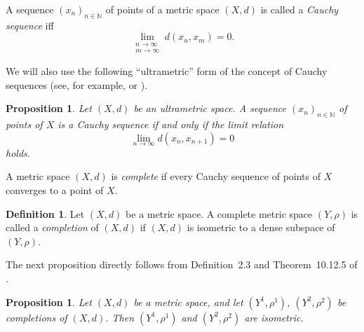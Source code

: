 \documentclass[11pt]{article}
\newtheorem{proposition}[theorem]{Proposition}
\theoremstyle{definition}
\newtheorem{definition}[theorem]{Definition}
\theoremstyle{remark}
\numberwithin{equation}{section}
\begin{document}
 A sequence $(x_n)_{n \in \mathbb{N}}$ of points of a metric space $(X,d)$ is called a {\it Cauchy sequence} iff
\begin{equation*}
    \lim\limits_{\substack{n \to \infty \\ m \to \infty}} d(x_n, x_m) = 0.
\end{equation*}



   



We will also use the following ``ultrametric'' form of the concept of Cauchy sequences (see, for example, \cite[p.~4]{PerezGarcia2010} or \cite[Theorem~1.6]{Comicheo2018}).

\begin{proposition}\label{prop:ultrametric-cauchy}
Let $(X,d)$ be an ultrametric space. A sequence $(x_n)_{n\in\mathbb{N}}$ of points of $X$ 
is a Cauchy sequence if and only if the limit relation
\begin{equation*}
\lim_{n\to\infty} d(x_n, x_{n+1}) = 0
\end{equation*}
holds.
\end{proposition}








A metric space $(X,d)$ is \textit{complete} if every Cauchy sequence of points of $X$ converges to a point of $X$.
 

\begin{definition}\label{ssmmcc}
    Let $(X,d)$ be a metric space.  
A complete metric space $(Y,\rho)$ is called a \textit{completion} of $(X,d)$ if $(X,d)$ is isometric to a dense subspace of $(Y,\rho)$.
\end{definition}





The next proposition directly follows from Definition~2.3 and Theorem~10.12.5 of \cite{Sea2007}.
\begin{proposition}
    \label{fvhjjm}
 Let $(X,d)$ be a metric space, and let $(Y^1,\rho^1)$, $(Y^2,\rho^2)$ be
completions of $(X,d)$. Then $(Y^1,\rho^1)$ and $(Y^2,\rho^2)$  are isometric.
\end{proposition}
\end{document}
